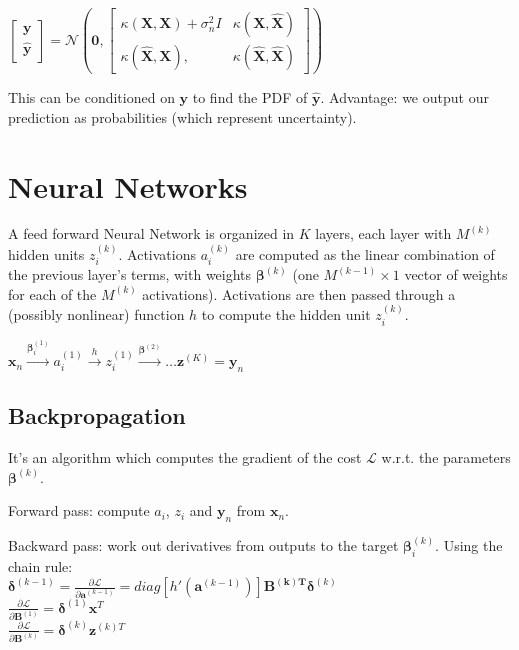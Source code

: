 \documentclass[10pt,a4paper,landscape]{article}
\renewcommand{\bf}[1]{\ensuremath{\mathbf{#1}}}
\newcommand{\bbeta}{\boldsymbol\beta}
\newcommand{\bdelta}{\boldsymbol\delta}
\begin{document}
\begin{multicols*}{4}
$
\begin{bmatrix}
  \bf{y} \\
  \bf{\hat{y}}
\end{bmatrix}
=
\mathcal{N} \left(
  \bf{0},
  \begin{bmatrix}
    \kappa(\bf{X}, \bf{X}) + \sigma_n^2 I  & \kappa(\bf{X}, \bf{\hat{X}}) \\
    \kappa(\bf{\hat{X}}, \bf{X}),          & \kappa(\bf{\hat{X}}, \bf{\hat{X}})
  \end{bmatrix}
\right)
$

This can be conditioned on $\bf{y}$ to find the PDF of $\bf{\hat{y}}$. Advantage: we output our prediction as probabilities (which represent uncertainty).

\section{Neural Networks}
A feed forward Neural Network is organized in $K$ layers, each layer with $M^{(k)}$ hidden units $z_i^{(k)}$. Activations $a_i^{(k)}$ are computed as the linear combination of the previous layer's terms, with weights $\bbeta^{(k)}$ (one $M^{(k-1)} \times 1$ vector of weights for each of the $M^{(k)}$ activations). Activations are then passed through a (possibly nonlinear) function $h$ to compute the hidden unit $z_i^{(k)}$.

$\bf{x}_n \xrightarrow{\bbeta_i^{(1)}} a_i^{(1)} \xrightarrow{h} z_i^{(1)} \xrightarrow{\bbeta^{(2)}} \dots \bf{z}^{(K)} = \bf{y}_n$

\subsection{Backpropagation}
It's an algorithm which computes the gradient of the cost $\mathcal{L}$ w.r.t. the parameters $\bbeta^{(k)}$.

Forward pass: compute $a_i$, $z_i$ and $\bf{y}_n$ from $\bf{x}_n$.

Backward pass: work out derivatives from outputs to the target $\bbeta_i^{(k)}$. Using the chain rule:\\
$\bdelta^{(k-1)} = \frac{\partial \mathcal{L}}{\partial \bf{a}^{(k-1)}} = diag[ h'(\bf{a}^{(k-1)}) ] \bf{B^{(k)T}} \bdelta^{(k)}$\\
$\frac{\partial \mathcal{L}}{\partial \bf{B}^{(1)}} = \bdelta^{(1)} \bf{x}^T$\\
$\frac{\partial \mathcal{L}}{\partial \bf{B}^{(k)}} = \bdelta^{(k)} \bf{z}^{(k)T}$


\end{multicols*}
\end{document}

